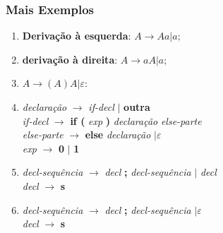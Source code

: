 \documentclass[table]{beamer}
\begin{document}
\begin{frame}
   \frametitle{Mais Exemplos}
   \begin{enumerate}
      \item \textbf{Derivação à esquerda}: $A \to Aa|a$;
      \item \textbf{derivação à direita}: $A \to aA|a$;
      \item $A \to (A)A|\varepsilon$:
      \item \textit{declaração} $\to$ \textit{if-decl} $|$ \textbf{outra} \\
      \textit{if-decl} $\to$ \textbf{if (} \textit{exp} \textbf{)} \textit{declaração} \textit{else-parte} \\ 
      \textit{else-parte} $\to$ \textbf{else} \textit{declaração} $| \varepsilon$ \\
      \textit{exp} $\to$ \textbf{0} $|$ \textbf{1}
      \item \textit{decl-sequência} $\to$ \textit{decl} \textbf{;} \textit{decl-sequência} $|$ \textit{decl} \\
      \textit{decl} $\to$ \textbf{s}
      \item \textit{decl-sequência} $\to$ \textit{decl} \textbf{;} \textit{decl-sequência} $|\varepsilon$ \\
      \textit{decl} $\to$ \textbf{s}
   \end{enumerate}
\end{frame}
\end{document}
